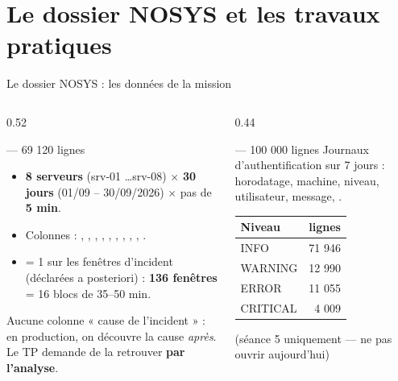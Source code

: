 \section{Le dossier NOSYS et les travaux pratiques}

\begin{frame}{Le dossier NOSYS : les données de la mission}
\begin{columns}[t]
\begin{column}{0.52\textwidth}
\begin{block}{ --- 69 120 lignes}
\begin{itemize}
\item \textbf{8 serveurs} (srv-01 \ldots srv-08) $\times$ \textbf{30 jours}
(01/09 -- 30/09/2026) $\times$ pas de \textbf{5 min}.
\item Colonnes : , , , ,
, , , ,
, .
\item {} = 1 sur les fenêtres d'incident (déclarées a posteriori) :
\textbf{136 fenêtres} = 16 blocs de 35--50 min.
\end{itemize}
\end{block}
\begin{ebox}
Aucune colonne « cause de l'incident » : en production, on découvre la cause
\emph{après}. Le TP demande de la retrouver \textbf{par l'analyse}.
\end{ebox}
\end{column}
\begin{column}{0.44\textwidth}
\begin{block}{ --- 100 000 lignes}
Journaux d'authentification sur 7 jours : horodatage, machine, niveau,
utilisateur, message, .
\begin{center}\small
\begin{tabular}{@{}lr@{}}
\toprule
Niveau & lignes\\
\midrule
INFO & 71 946\\
WARNING & 12 990\\
ERROR & 11 055\\
CRITICAL & 4 009\\
\bottomrule
\end{tabular}
\end{center}
\begin{center}\small
(séance 5 uniquement --- ne pas ouvrir aujourd'hui)
\end{center}
\end{block}
\end{column}
\end{columns}
\end{frame}

